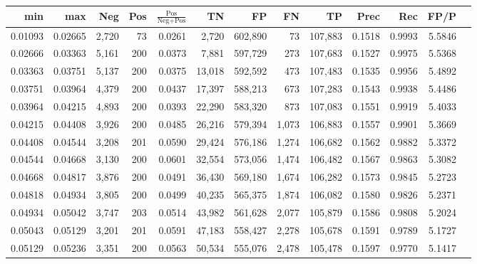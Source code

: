 \begin{tabular}{rrrrrrrrrrrrr}
\toprule
    min &     max &   Neg & Pos & $\frac{\text{Pos}}{\text{Neg}+\text{Pos}}$ &      TN &      FP &      FN &      TP &   Prec &    Rec &   FP/P \\
\midrule
0.01093 & 0.02665 & 2,720 &  73 &                                     0.0261 &   2,720 & 602,890 &      73 & 107,883 & 0.1518 & 0.9993 & 5.5846 \\
0.02666 & 0.03363 & 5,161 & 200 &                                     0.0373 &   7,881 & 597,729 &     273 & 107,683 & 0.1527 & 0.9975 & 5.5368 \\
0.03363 & 0.03751 & 5,137 & 200 &                                     0.0375 &  13,018 & 592,592 &     473 & 107,483 & 0.1535 & 0.9956 & 5.4892 \\
0.03751 & 0.03964 & 4,379 & 200 &                                     0.0437 &  17,397 & 588,213 &     673 & 107,283 & 0.1543 & 0.9938 & 5.4486 \\
0.03964 & 0.04215 & 4,893 & 200 &                                     0.0393 &  22,290 & 583,320 &     873 & 107,083 & 0.1551 & 0.9919 & 5.4033 \\
0.04215 & 0.04408 & 3,926 & 200 &                                     0.0485 &  26,216 & 579,394 &   1,073 & 106,883 & 0.1557 & 0.9901 & 5.3669 \\
0.04408 & 0.04544 & 3,208 & 201 &                                     0.0590 &  29,424 & 576,186 &   1,274 & 106,682 & 0.1562 & 0.9882 & 5.3372 \\
0.04544 & 0.04668 & 3,130 & 200 &                                     0.0601 &  32,554 & 573,056 &   1,474 & 106,482 & 0.1567 & 0.9863 & 5.3082 \\
0.04668 & 0.04817 & 3,876 & 200 &                                     0.0491 &  36,430 & 569,180 &   1,674 & 106,282 & 0.1573 & 0.9845 & 5.2723 \\
0.04818 & 0.04934 & 3,805 & 200 &                                     0.0499 &  40,235 & 565,375 &   1,874 & 106,082 & 0.1580 & 0.9826 & 5.2371 \\
0.04934 & 0.05042 & 3,747 & 203 &                                     0.0514 &  43,982 & 561,628 &   2,077 & 105,879 & 0.1586 & 0.9808 & 5.2024 \\
0.05043 & 0.05129 & 3,201 & 201 &                                     0.0591 &  47,183 & 558,427 &   2,278 & 105,678 & 0.1591 & 0.9789 & 5.1727 \\
0.05129 & 0.05236 & 3,351 & 200 &                                     0.0563 &  50,534 & 555,076 &   2,478 & 105,478 & 0.1597 & 0.9770 & 5.1417 \\

\end{tabular}
